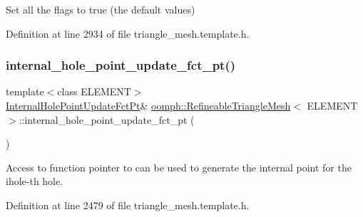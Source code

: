 Set all the flags to true (the default values) 



Definition at line 2934 of file triangle\+\_\+mesh.\+template.\+h.

\mbox{\label{classoomph_1_1RefineableTriangleMesh_af6e60e92bff82e8bf26ffd170125559c}} 
\subsubsection{\texorpdfstring{internal\+\_\+hole\+\_\+point\+\_\+update\+\_\+fct\+\_\+pt()}{internal\_hole\_point\_update\_fct\_pt()}}
{\footnotesize\ttfamily template$<$class E\+L\+E\+M\+E\+NT$>$ \\
\hyperlink{classoomph_1_1RefineableTriangleMesh_aa6831f42aa1941f4ae0b9186d01f9d7c}{Internal\+Hole\+Point\+Update\+Fct\+Pt}\& \hyperlink{classoomph_1_1RefineableTriangleMesh}{oomph\+::\+Refineable\+Triangle\+Mesh}$<$ E\+L\+E\+M\+E\+NT $>$\+::internal\+\_\+hole\+\_\+point\+\_\+update\+\_\+fct\+\_\+pt (\begin{DoxyParamCaption}{ }\end{DoxyParamCaption})\hspace{0.3cm}{\ttfamily [inline]}}



Access to function pointer to can be used to generate the internal point for the ihole-\/th hole. 



Definition at line 2479 of file triangle\+\_\+mesh.\+template.\+h.

\mbox{\label{classoomph_1_1RefineableTriangleMesh_aaffa40b7d036f8ed8639bf9396f1088a}} 
